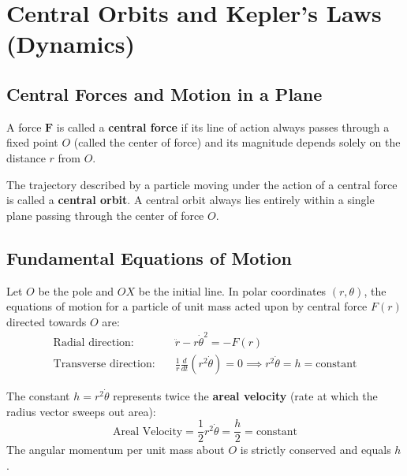 \chapter{Central Orbits and Kepler's Laws (Dynamics)}

\section{Central Forces and Motion in a Plane}

\begin{defbox}
A force $\mathbf{F}$ is called a \textbf{central force} if its line of action always passes through a fixed point $O$ (called the center of force) and its magnitude depends solely on the distance $r$ from $O$.

The trajectory described by a particle moving under the action of a central force is called a \textbf{central orbit}. A central orbit always lies entirely within a single plane passing through the center of force $O$.
\end{defbox}

\section{Fundamental Equations of Motion}

Let $O$ be the pole and $OX$ be the initial line. In polar coordinates $(r, \theta)$, the equations of motion for a particle of unit mass acted upon by central force $F(r)$ directed towards $O$ are:
\begin{align}
    \text{Radial direction:} \quad & \ddot{r} - r \dot{\theta}^2 = -F(r) \label{eq:central_rad_full} \\
    \text{Transverse direction:} \quad & \frac{1}{r} \frac{d}{dt}(r^2 \dot{\theta}) = 0 \implies r^2 \dot{\theta} = h = \text{constant} \label{eq:central_trans_full}
\end{align}

\begin{keybox}
The constant $h = r^2 \dot{\theta}$ represents twice the \textbf{areal velocity} (rate at which the radius vector sweeps out area):
\begin{equation}
    \text{Areal Velocity} = \frac{1}{2} r^2 \dot{\theta} = \frac{h}{2} = \text{constant}
\end{equation}
The angular momentum per unit mass about $O$ is strictly conserved and equals $h$.
\end{keybox}

